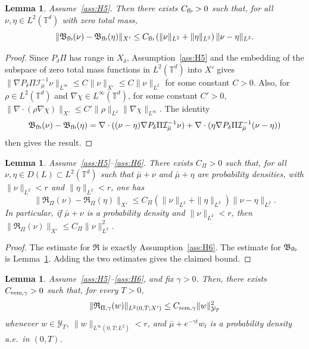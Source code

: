 \documentclass[11pt]{article}
\numberwithin{equation}{section}
\newtheorem{lemma}[theorem]{Lemma}
\theoremstyle{definition}
\newcommand{\T}{\mathbb{T}}
\newcommand{\rieszmap}[1][\mu]{\mathcal{I}_{#1}}
\begin{document}
\begin{lemma}
\label{lem:feedback_remainder}
    Assume~\ref{ass:H5}. 
    Then there exists $C_{\rm fb} > 0$ such that, for all $\nu, \eta\in L^2(\T^d)$ with zero total mass,
    \[
    \|\mathfrak{B}_{\rm fb}(\nu) - \mathfrak{B}_{\rm fb}(\eta)\|_{X'} \le C_{\rm fb}\left(\|\nu\|_{L^2} + \|\eta\|_{L^2}\right) \|\nu-\eta\|_{L^2}.
    \]
\end{lemma}

\begin{proof}
    Since $P_\delta\Pi$ has range in $X_\delta$, Assumption~\ref{ass:H5} and the embedding of the subspace of zero total mass functions in $L^2(\T^d)$ into $X'$ gives $\|\nabla P_\delta\Pi\rieszmap[\bar\mu]^{-1} \nu\|_{L^\infty} \le C\|\nu\|_{X'} \le C\|\nu\|_{L^2}$ for some constant $C > 0$.
    Also, for $\rho \in L^2(\T^d)$ and $\nabla\chi \in L^\infty(\T^d)$, for some constant $C' > 0$, $\|\nabla\cdot(\rho\nabla\chi)\|_{X'} \le C'\|\rho\|_{L^2}\|\nabla\chi\|_{L^\infty}$.
    The identity
    \[
    \mathfrak{B}_{\rm fb}(\nu)-\mathfrak{B}_{\rm fb}(\eta) = \nabla\cdot((\nu-\eta)\nabla P_\delta\Pi\rieszmap[\bar\mu]^{-1}\nu) + \nabla \cdot(\eta \nabla P_\delta\Pi\rieszmap[\bar\mu]^{-1}(\nu-\eta))
    \]
    then gives the result.
\end{proof}

\begin{lemma}
\label{lem:full_remainder}
    Assume~\ref{ass:H5}--\ref{ass:H6}. 
    There exists $C_\Pi > 0$ such that, for all $\nu, \eta \in D(L) \subset L^2(\T^d)$ such that $\bar\mu + \nu$ and $\bar\mu + \eta$ are probability densities, with $\|\nu\|_{L^2} < r$ and $\|\eta\|_{L^2} < r$, one has
    \[
    \|\mathfrak{R}_\Pi(\nu)-\mathfrak{R}_\Pi(\eta)\|_{X'} \le C_\Pi\left(\|\nu\|_{L^2}+\|\eta\|_{L^2}\right)\|\nu-\eta\|_{L^2}.
    \]
    In particular, if $\bar\mu + \nu$ is a probability density and $\|\nu\|_{L^2} < r$, then $\|\mathfrak{R}_\Pi(\nu)\|_{X'} \le C_\Pi\|\nu\|_{L^2}^2$.
\end{lemma}

\begin{proof}
    The estimate for $\mathfrak{R}$ is exactly Assumption~\ref{ass:H6}. 
    The estimate for $\mathfrak{B}_{\rm fb}$ is Lemma~\ref{lem:feedback_remainder}. 
    Adding the two estimates gives the claimed bound. 
\end{proof}

\begin{lemma}
\label{lem:weighted_remainder}
    Assume~\ref{ass:H5}--\ref{ass:H6}, and fix $\gamma > 0$.
    Then, there exists $C_{\rm rem,\gamma} > 0$ such that, for every $T > 0$,
    \[
    \|\mathfrak{R}_{\Pi, \gamma}(w)\|_{L^2(0,T;X')} \le C_{\rm rem, \gamma}\|w\|_{\mathcal{Y}_T}^2
    \]
    whenever $w \in \mathcal{Y}_T$, $\|w\|_{L^\infty(0,T; L^2)} < r$, and $\bar\mu+e^{-\gamma t} w_t$ is a probability density a.e.\ in $(0,T)$.
\end{lemma}
\end{document}

